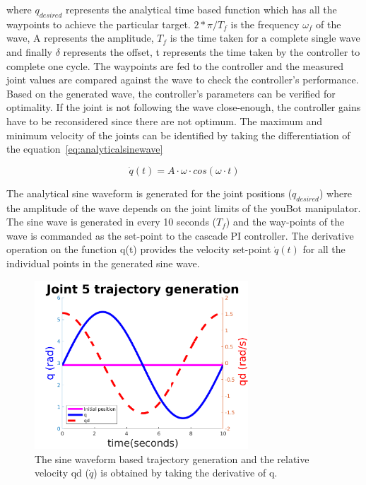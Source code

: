 where $q_{desired}$ represents the analytical time based function which has all the waypoints to achieve the particular target. $2*\pi / T_f$ is the frequency $\omega_f$ of the wave, A represents the amplitude, $T_f$ is the time taken for a complete single wave and finally $\delta$ represents the offset, t represents the time taken by the controller to complete one cycle. The waypoints are fed to the controller and the measured joint values are compared against the wave to check the controller's performance. Based on the generated wave, the controller's parameters can be verified for optimality. If the joint is not following the wave close-enough, the controller gains have to be reconsidered since there are not optimum. The maximum and minimum velocity of the joints can be identified by taking the differentiation of the equation~\eqref{eq:analyticalsinewave}

\begin{equation}
\dot{q}(t) = A\cdot \omega \cdot cos(\omega \cdot t)
\label{eq:coswave}
\end{equation}

The analytical sine waveform is generated for the joint positions ($q_{desired}$) where the amplitude of the wave depends on the joint limits of the youBot manipulator. The sine wave is generated in every 10 seconds ($T_f$) and the way-points of the wave is commanded as the set-point to the cascade PI controller. The derivative operation on the function q(t) provides the velocity set-point $\dot{q}(t)$ for all the individual points in the generated sine wave.

\begin{figure}[h]
\centering
\includegraphics[width=80mm, trim=0 0 0 0]{pictures/sinewave}
\caption{The sine waveform based trajectory generation and the relative velocity qd ($\dot{q}$) is obtained by taking the derivative of q.}
\end{figure}

